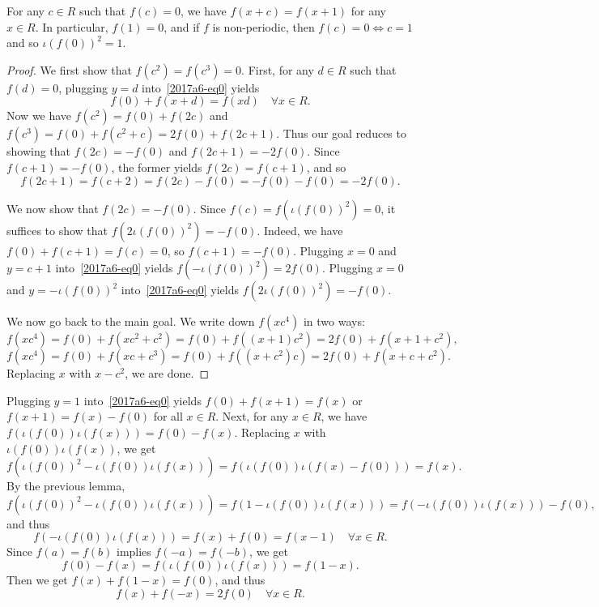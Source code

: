\begin{theorem}
For any $c \in R$ such that $f(c) = 0$, we have $f(x + c) = f(x + 1)$ for any $x \in R$.
In particular, $f(1) = 0$, and if $f$ is non-periodic, then $f(c) = 0 \iff c = 1$ and so $\iota(f(0))^2 = 1$.
\end{theorem}
\begin{proof}
We first show that $f(c^2) = f(c^3) = 0$.
First, for any $d \in R$ such that $f(d) = 0$, plugging $y = d$ into~\eqref{2017a6-eq0} yields
\[ f(0) + f(x + d) = f(xd) \quad \forall x \in R. \]
Now we have $f(c^2) = f(0) + f(2c)$ and $f(c^3) = f(0) + f(c^2 + c) = 2 f(0) + f(2c + 1)$.
Thus our goal reduces to showing that $f(2c) = -f(0)$ and $f(2c + 1) = -2 f(0)$.
Since $f(c + 1) = -f(0)$, the former yields $f(2c) = f(c + 1)$, and so
\[ f(2c + 1) = f(c + 2) = f(2c) - f(0) = -f(0) - f(0) = -2 f(0). \]

We now show that $f(2c) = -f(0)$.
Since $f(c) = f(\iota(f(0))^2) = 0$, it suffices to show that $f(2 \iota(f(0))^2) = -f(0)$.
Indeed, we have $f(0) + f(c + 1) = f(c) = 0$, so $f(c + 1) = -f(0)$.
Plugging $x = 0$ and $y = c + 1$ into~\eqref{2017a6-eq0} yields $f(- \iota(f(0))^2) = 2 f(0)$.
Plugging $x = 0$ and $y = -\iota(f(0))^2$ into~\eqref{2017a6-eq0} yields $f(2 \iota(f(0))^2) = -f(0)$.

We now go back to the main goal.
We write down $f(xc^4)$ in two ways:
\[ f(xc^4) = f(0) + f(xc^2 + c^2) = f(0) + f((x + 1) c^2) = 2 f(0) + f(x + 1 + c^2), \]
\[ f(xc^4) = f(0) + f(xc + c^3) = f(0) + f((x + c^2) c) = 2 f(0) + f(x + c + c^2). \]
Replacing $x$ with $x - c^2$, we are done.
\end{proof}

Plugging $y = 1$ into~\eqref{2017a6-eq0} yields $f(0) + f(x + 1) = f(x)$ or $f(x + 1) = f(x) - f(0)$ for all $x \in R$.
Next, for any $x \in R$, we have $f(\iota(f(0)) \iota(f(x))) = f(0) - f(x)$.
Replacing $x$ with $\iota(f(0)) \iota(f(x))$, we get
\[ f(\iota(f(0))^2 - \iota(f(0)) \iota(f(x))) = f(\iota(f(0)) \iota(f(x) - f(0))) = f(x). \]
By the previous lemma,
\[ f(\iota(f(0))^2 - \iota(f(0)) \iota(f(x))) = f(1 - \iota(f(0)) \iota(f(x))) = f(-\iota(f(0)) \iota(f(x))) - f(0), \]
    and thus
\[ f(-\iota(f(0)) \iota(f(x))) = f(x) + f(0) = f(x - 1) \quad \forall x \in R. \tag{1.1}\label{2017a6-eq-basic1} \]
Since $f(a) = f(b)$ implies $f(-a) = f(-b)$, we get
\[ f(0) - f(x) = f(\iota(f(0)) \iota(f(x))) = f(1 - x). \tag{1.2}\label{2017a6-eq-basic2} \]
Then we get $f(x) + f(1 - x) = f(0)$, and thus
\[ f(x) + f(-x) = 2 f(0) \quad \forall x \in R. \tag{1.3}\label{2017a6-eq-basic3} \]

